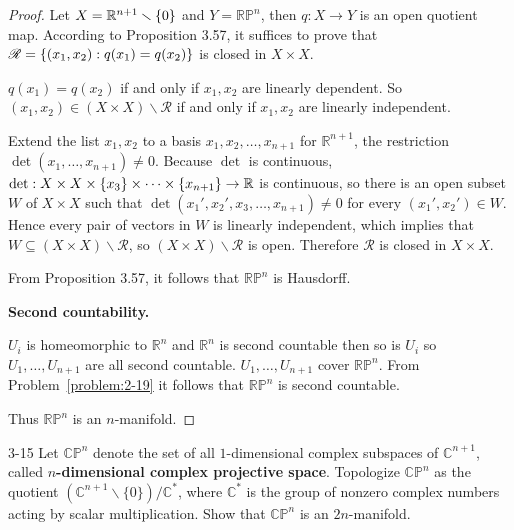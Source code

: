 \begin{proof}
	Let $X = \mathbb{R}^{n+1}\smallsetminus\left\{{0}\right\}$ and $Y = \mathbb{RP}^{n}$, then $q: X\to Y$ is an open quotient map. According to Proposition 3.57, it suffices to prove that $\mathscr{R} = \left\{{ (x_{1}, x_{2}) : q(x_{1}) = q(x_{2}) }\right\}$ is closed in $X\times X$.

	$q(x_{1}) = q(x_{2})$ if and only if $x_{1}, x_{2}$ are linearly dependent. So $(x_{1}, x_{2}) \in (X\times X)\smallsetminus\mathscr{R}$ if and only if $x_{1}, x_{2}$ are linearly independent.

	Extend the list $x_{1}, x_{2}$ to a basis $x_{1}, x_{2}, \ldots, x_{n+1}$ for $\mathbb{R}^{n+1}$, the restriction $\det(x_{1}, \ldots, x_{n+1}) \ne 0$. Because $\det$ is continuous, $\det: X\times X\times\left\{{x_{3}}\right\}\times\cdots\times\left\{{x_{n+1}}\right\} \to \mathbb{R}$ is continuous, so there is an open subset $W$ of $X\times X$ such that $\det(x_{1}', x_{2}', x_{3}, \ldots, x_{n+1}) \ne 0$ for every $(x_{1}', x_{2}') \in W$. Hence every pair of vectors in $W$ is linearly independent, which implies that $W \subseteq (X\times X)\smallsetminus\mathscr{R}$, so $(X\times X)\smallsetminus\mathscr{R}$ is open. Therefore $\mathscr{R}$ is closed in $X\times X$.

	From Proposition 3.57, it follows that $\mathbb{RP}^{n}$ is Hausdorff.

	\textbf{Second countability.}

	$U_{i}$ is homeomorphic to $\mathbb{R}^{n}$ and $\mathbb{R}^{n}$ is second countable then so is $U_{i}$ so $U_{1}, \ldots, U_{n+1}$ are all second countable. $U_{1}, \ldots, U_{n+1}$ cover $\mathbb{RP}^{n}$. From Problem~\ref{problem:2-19} it follows that $\mathbb{RP}^{n}$ is second countable.

	Thus $\mathbb{RP}^{n}$ is an $n$-manifold.
\end{proof}

\begin{problem}{3-15}\label{problem:3-15}
Let ${\mathbb{CP}}^{n}$ denote the set of all $1$-dimensional complex subspaces of $\mathbb{C}^{n+1}$, called \textbf{$n$-dimensional complex projective space}. Topologize ${\mathbb{CP}}^{n}$ as the quotient ${(\mathbb{C}^{n+1}\smallsetminus \{0\})}/\mathbb{C}^{*}$, where $\mathbb{C}^{*}$ is the group of nonzero complex numbers acting by scalar multiplication. Show that $\mathbb{CP}^{n}$ is an $2n$-manifold.
\end{problem}

